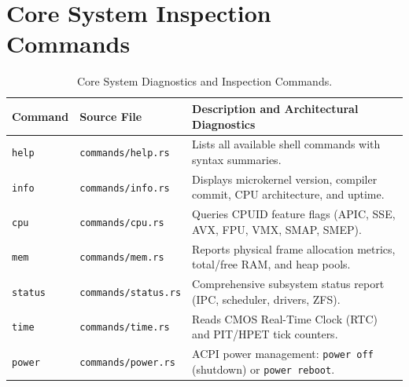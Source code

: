 \section{Core System Inspection Commands}
\label{sec:shell_core_cmds}

\begin{table}[htbp]
\centering
\small
\begin{tabularx}{\textwidth}{llX}
\toprule
\textbf{Command} & \textbf{Source File} & \textbf{Description and Architectural Diagnostics} \\
\midrule
\texttt{help} & \texttt{commands/help.rs} & Lists all available shell commands with syntax summaries. \\
\texttt{info} & \texttt{commands/info.rs} & Displays microkernel version, compiler commit, CPU architecture, and uptime. \\
\texttt{cpu} & \texttt{commands/cpu.rs} & Queries CPUID feature flags (APIC, SSE, AVX, FPU, VMX, SMAP, SMEP). \\
\texttt{mem} & \texttt{commands/mem.rs} & Reports physical frame allocation metrics, total/free RAM, and heap pools. \\
\texttt{status} & \texttt{commands/status.rs} & Comprehensive subsystem status report (IPC, scheduler, drivers, ZFS). \\
\texttt{time} & \texttt{commands/time.rs} & Reads CMOS Real-Time Clock (RTC) and PIT/HPET tick counters. \\
\texttt{power} & \texttt{commands/power.rs} & ACPI power management: \texttt{power off} (shutdown) or \texttt{power reboot}. \\
\bottomrule
\end{tabularx}
\caption{Core System Diagnostics and Inspection Commands.}
\label{tab:shell_core_cmds}
\end{table}

